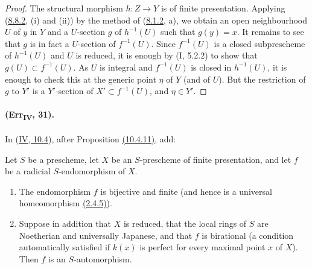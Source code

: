 \begin{proof}
The structural morphism $h:Z\to Y$ is of finite presentation.  Applying
({\hyperlink{ega4.c04.thm.8-8-2}{8.8.2}}, (i) and (ii)) by the method of ({\hyperlink{ega4.c04.statement.8-1-2}{8.1.2}}, a), we obtain an open
neighbourhood $U$ of $y$ in $Y$ and a $U$-section $g$ of $h^{-1}(U)$
such that $g(y)=x$.  It remains to see that $g$ is in fact a $U$-section
of $f^{-1}(U)$.  Since $f^{-1}(U)$ is a closed subprescheme of
$h^{-1}(U)$ and $U$ is reduced, it is enough by (I, 5.2.2) to show that
$g(U)\subset f^{-1}(U)$.  As $U$ is integral and $f^{-1}(U)$ is closed
in $h^{-1}(U)$, it is enough to check this at the generic point $\eta$
of $Y$ (and of $U$).  But the restriction of $g$ to $Y'$ is a
$Y'$-section of $X'\subset f^{-1}(U)$, and $\eta\in Y'$.
\end{proof}

\paragraph{(Err\textsubscript{IV}, 31).}
In ({\hyperlink{ega4.c04.subsec.10-4}{IV, 10.4}}), after Proposition {\hyperlink{ega4.c04.statement.10-4-11}{(10.4.11)}}, add:

\begin{corollary}[10.4.12]
\label{IV.10.4.12}
Let $S$ be a prescheme, let $X$ be an $S$-prescheme of finite
presentation, and let $f$ be a radicial $S$-endomorphism of $X$.
\begin{enumerate}[label=\textup{(\roman*)}]
\item The endomorphism $f$ is bijective and finite (and hence is a
universal homeomorphism {\hyperlink{ega4.c04.prop.2-4-5}{(2.4.5)}}).
\item Suppose in addition that $X$ is reduced, that the local rings of
$S$ are Noetherian and universally Japanese, and that $f$ is
birational (a condition automatically satisfied if $k(x)$ is perfect
for every maximal point $x$ of $X$).  Then $f$ is an
$S$-automorphism.
\end{enumerate}
\end{corollary}

